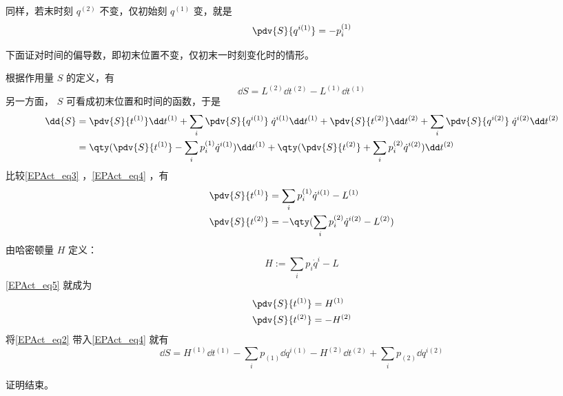 同样，若末时刻 $q^{(2)}$ 不变，仅初始刻 $q^{(1)}$ 变，就是
\begin{equation}
\pdv{S}{{q}^{i (1)}}=-p_i^{(1)}
\end{equation}

下面证对时间的偏导数，即初末位置不变，仅初末一时刻变化时的情形。

根据作用量 $S$ 的定义，有
\begin{equation}\label{EPAct_eq3}
\dd{S}=L^{(2)}\dd t^{(2)}-L^{(1)}\dd t^{(1)}
\end{equation}
另一方面， $S$ 可看成初末位置和时间的函数，于是
\begin{equation}\label{EPAct_eq4}
\begin{aligned}
\dd{S}&=\pdv{S}{t^{(1)}}\dd t^{(1)}+\sum_i\pdv{S}{{q}^{i (1)}}\;{\dot q}^{i (1)}\dd t^{(1)}+\pdv{S}{t^{(2)}}\dd t^{(2)}+\sum_i\pdv{S}{{q}^{i (2)}}\; {\dot q}^{i (2)}\dd t^{(2)} \\
&=\qty(\pdv{S}{t^{(1)}}-\sum_i p_i^{(1)} {\dot q}^{i (1)})\dd t^{(1)}+\qty(\pdv{S}{t^{(2)}}+\sum_i p_i^{(2)}{\dot q}^{i (2)})\dd t^{(2)}
\end{aligned}
\end{equation}
比较\autoref{EPAct_eq3} ，\autoref{EPAct_eq4} ，有
\begin{equation}\label{EPAct_eq5}
\begin{aligned}
\pdv{S}{t^{(1)}}&=\sum_i p_i^{(1)}{\dot q}^{i (1)}-L^{(1)}\\
\pdv{S}{t^{(2)}}&=-\qty(\sum_i p_i^{(2)}{\dot q}^{i (2)}-L^{(2)})
\end{aligned}
\end{equation}
由哈密顿量 $H$ 定义：
\begin{equation}
H:=\sum_i p_i {\dot q^i}-L
\end{equation}
\autoref{EPAct_eq5} 就成为
\begin{equation}\label{EPAct_eq2}
\begin{aligned}
\pdv{S}{t^{(1)}}&=H^{(1)}\\
\pdv{S}{t^{(2)}}&=-H^{(2)}
\end{aligned}
\end{equation}
将\autoref{EPAct_eq2} 带入\autoref{EPAct_eq4} 就有
\begin{equation}
\dd{S}=H^{(1)}\dd t^{(1)}-\sum_ip_{(1)}\dd {q}^{i (1)}-H^{(2)}\dd t^{(2)}+\sum_i p_{(2)}\dd {q}^{i (2)}
\end{equation}

证明结束。
